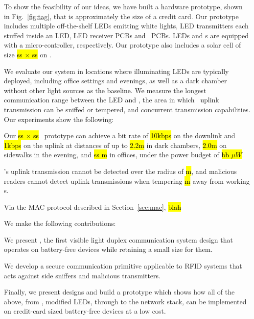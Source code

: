 To show the feasibility of our ideas, we have built a hardware prototype, shown in Fig.~\ref{fig:tag}, that is approximately the size of a credit card. Our prototype includes multiple off-the-shelf LEDs emitting white lights, LED transmitters each stuffed inside an LED, LED receiver PCBs and \vitag\ PCBs. LEDs and \vitag\/s are equipped with a micro-controller, respectively. Our prototype also includes a solar cell of size \hl{ss $\times$ ss} on \vitag.

We evaluate our system in locations where illuminating LEDs are typically deployed, including office settings and evenings, as well as a dark chamber without other light sources as the baseline. We measure the longest communication range between the LED and \vitag, the area in which \vitag\ uplink transmission can be sniffed or tempered, and concurrent transmission capabilities. Our experiments show the following:

\begin{Itemize}
\item  Our \hl{ss $\times$ ss} \vitag\ prototype can achieve a bit rate of \hl{10kbps} on the downlink and \hl{1kbps} on the uplink at distances of up to \hl{2.2m} in dark chambers, \hl{2.0m} on sidewalks in the evening, and \hl{ss m} in offices, under the power budget of \hl{bb $\mu W$}.
\item \vitag's uplink transmission cannot be detected over the radius of \hl{m}, and malicious readers cannot detect uplink transmissions when tempering \hl{m} away from working \vitag\/s.
\item Via the MAC protocol described in Section~\ref{sec:mac}, \hl{blah}
\end{Itemize}

\vskip 0.05in We make the following contributions:
\begin{Itemize}
\item We present \vitag, the first visible light duplex communication system design that operates on battery-free devices while retaining a small size for them.
\item We develop a secure communication primitive applicable to RFID systems that acts against side sniffers and malicious transmitters.
\item Finally, we present designs and build a prototype which shows how all of the above, from \vitag, modified LEDs, through to the network stack, can be implemented on credit-card sized battery-free devices at a low cost.
\end{Itemize}


